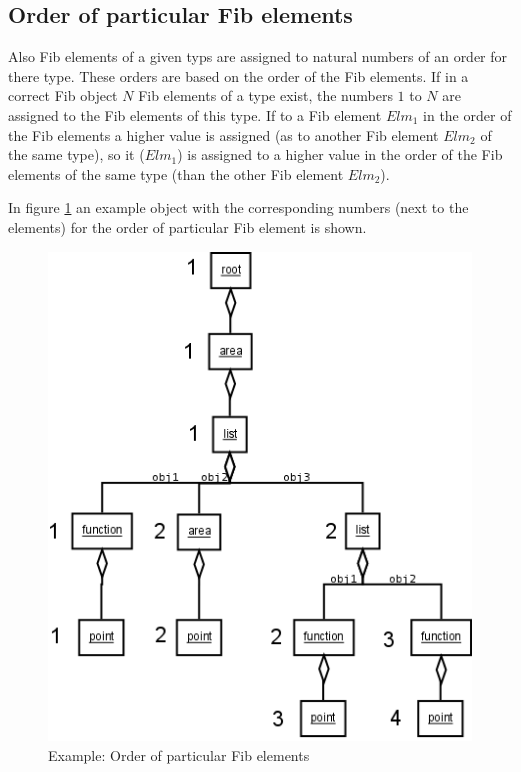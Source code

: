 \subsection{Order of particular Fib elements}

Also Fib elements of a given typs are assigned to natural numbers of an order for there type. These orders are based on the order of the Fib elements. If in a correct Fib object $N$ Fib elements of a type exist, the numbers $1$ to $N$ are assigned to the Fib elements of this type. If to a Fib element $Elm_1$ in the order of the Fib elements a higher value is assigned (as to another Fib element $Elm_2$ of the same type), so it ($Elm_1$) is assigned to a higher value in the order of the Fib elements of the same type (than the other Fib element $Elm_2$).

In figure \ref{figOrderSpecialFibElements} an example object with the corresponding numbers (next to the elements) for the order of particular Fib element is shown.

\begin{figure}[htbp]
\begin{center}
  \includegraphics[scale=0.5]{order_special_elements}
\end{center}
\caption{Example: Order of particular Fib elements}
\label{figOrderSpecialFibElements}
\end{figure}


